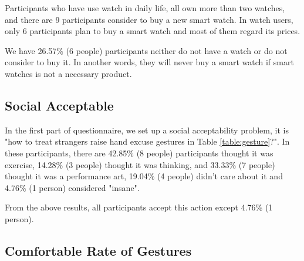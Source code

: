 Participants who have use watch in daily life, all own more than two watches, and there are 9 participants consider to buy a new smart watch. In watch users, only 6 participants plan to buy a smart watch and most of them regard its prices.

We have 26.57\% (6 people) participants neither do not have a watch or do not consider to buy it. In another words, they will never buy a smart watch if smart watches is not a necessary product.


\subsection{Social Acceptable}

In the first part of questionnaire, we set up a social acceptability problem, it is "how to treat strangers raise hand excuse gestures in Table \ref{table:gesture}?". In these participants, there are 42.85\% (8 people) participants thought it was exercise, 14.28\% (3 people) thought it was thinking, and 33.33\% (7 people) thought it was a performance art, 19.04\% (4 people) didn't care about it and 4.76\% (1 person) considered "insane".

From the above results, all participants accept this action except 4.76\% (1 person).

\subsection{Comfortable Rate of Gestures}

